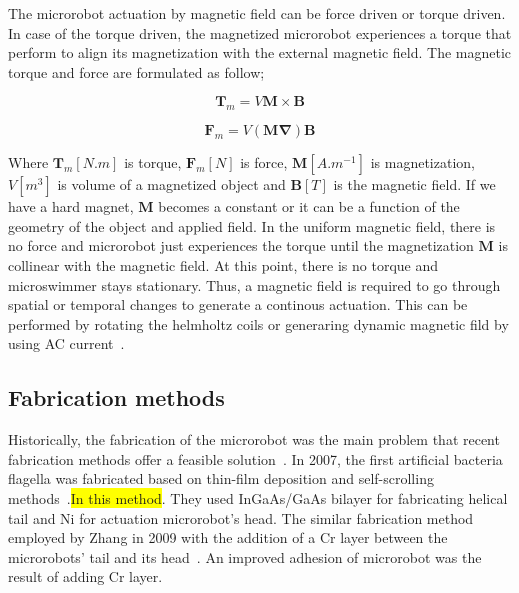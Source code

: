 \documentclass[12pt,a4paper,titlepage]{report}
\newcommand{\hilight}[1]{\colorbox{yellow}{#1}}
\begin{document}
The microrobot actuation by magnetic field can be force driven or torque driven. In case of the torque 
driven, the magnetized microrobot experiences a torque that perform to align its magnetization with the 
external magnetic field. The magnetic torque and force are formulated as follow;



\begin{equation}
  \bm{T}_m = V\bm{M} \times \bm{B}
\label{originalForce}
\end{equation}


\begin{equation}
  \bm{F}_m = V(\bm{M\nabla}) \bm{B}
\label{originalTorque}
\end{equation}

Where $\bm{T}_m [N.m]$ is torque, $\bm{F}_m [N]$ is force, $\bm{M} [A.m^{-1}]$ is magnetization, $V [m^3]$ is
volume of a magnetized object and $\bm{B} [T]$ is the magnetic field. If we have a hard magnet, $\bm{M}$ becomes
a constant or it can be a function of the geometry of the object and applied field. In the uniform magnetic field, 
there is no force and microrobot just experiences the torque until the magnetization $\bm{M}$ is collinear with the
magnetic field. At this point, there is no torque and microswimmer stays stationary. Thus, a magnetic field is required 
to go through spatial or temporal changes to generate a continous actuation. This can be performed by 
rotating the helmholtz coils or generaring dynamic magnetic fild by using AC current~\citep{peyer2013bio}.




\subsection{Fabrication methods} \label{fabrication}

Historically, the fabrication of the microrobot was the main problem that recent fabrication methods 
offer a feasible solution~\citep{gao2013bioinspired}.
In 2007, the first artificial bacteria flagella was fabricated based on thin-film deposition and self-scrolling
 methods~\citep{qiu2014noncytotoxic}.\hilight{In this method}. They used InGaAs/GaAs bilayer for fabricating
helical tail and Ni for actuation microrobot\rq{}s head. The similar fabrication method employed by Zhang
 in 2009 with the addition of a Cr layer between the microrobots\rq{} tail and its head~\citep{qiu2014noncytotoxic}.
An improved adhesion of microrobot was the result of adding Cr layer. 
\end{document}
